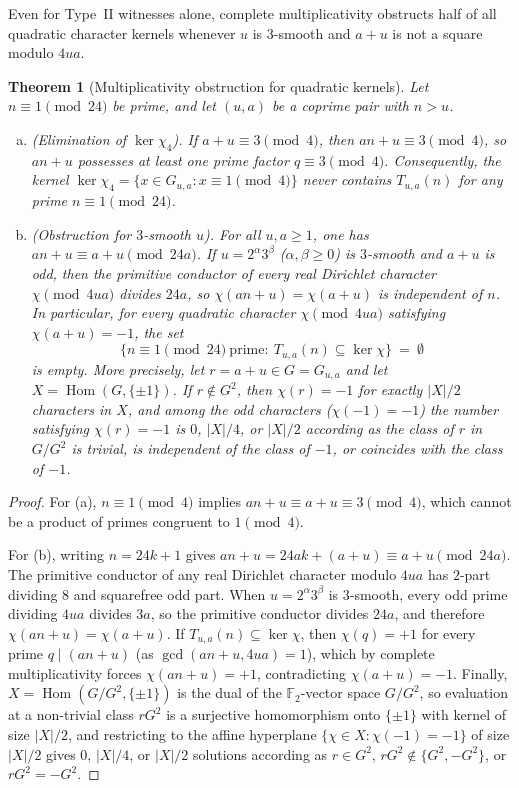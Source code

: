 \documentclass[11pt, a4paper]{article}
\theoremstyle{plain}
\newtheorem{theorem}{Theorem}[section]
\theoremstyle{definition}
\begin{document}
Even for Type~II witnesses alone, complete multiplicativity obstructs half of all quadratic character kernels whenever $u$ is $3$-smooth and $a+u$ is not a square modulo $4ua$.

\begin{theorem}[Multiplicativity obstruction for quadratic kernels]\label{thm:kernel_vacuity}
Let $n\equiv1\pmod{24}$ be prime, and let $(u,a)$ be a coprime pair with $n>u$.
\begin{enumerate}[(a)]
    \item \emph{(Elimination of $\ker\chi_4$).} If $a+u\equiv3\pmod 4$, then $an+u\equiv3\pmod 4$, so $an+u$ possesses at least one prime factor $q\equiv3\pmod 4$. Consequently, the kernel $\ker\chi_4=\{x\in G_{u,a}:x\equiv1\pmod 4\}$ never contains $T_{u,a}(n)$ for any prime $n\equiv1\pmod{24}$.
    \item \emph{(Obstruction for $3$-smooth $u$).} For all $u,a\ge1$, one has $an+u\equiv a+u\pmod{24a}$. If $u=2^{\alpha}3^{\beta}$ ($\alpha,\beta\ge0$) is $3$-smooth and $a+u$ is odd, then the primitive conductor of every real Dirichlet character $\chi\pmod{4ua}$ divides $24a$, so $\chi(an+u)=\chi(a+u)$ is independent of $n$. In particular, for every quadratic character $\chi\pmod{4ua}$ satisfying $\chi(a+u)=-1$, the set
    $$\big\{n\equiv1\pmod{24}\ \text{prime}:\ T_{u,a}(n)\subseteq\ker\chi\big\}\ =\ \emptyset$$
    is empty. More precisely, let $r=a+u\in G=G_{u,a}$ and let $X=\operatorname{Hom}(G,\{\pm1\})$. If $r\notin G^{2}$, then $\chi(r)=-1$ for exactly $|X|/2$ characters in $X$, and among the odd characters ($\chi(-1)=-1$) the number satisfying $\chi(r)=-1$ is $0$, $|X|/4$, or $|X|/2$ according as the class of $r$ in $G/G^{2}$ is trivial, is independent of the class of $-1$, or coincides with the class of $-1$.
\end{enumerate}
\end{theorem}
\begin{proof}
For (a), $n\equiv1\pmod 4$ implies $an+u\equiv a+u\equiv3\pmod 4$, which cannot be a product of primes congruent to $1\pmod 4$.

For (b), writing $n=24k+1$ gives $an+u=24ak+(a+u)\equiv a+u\pmod{24a}$. The primitive conductor of any real Dirichlet character modulo $4ua$ has $2$-part dividing $8$ and squarefree odd part. When $u=2^{\alpha}3^{\beta}$ is $3$-smooth, every odd prime dividing $4ua$ divides $3a$, so the primitive conductor divides $24a$, and therefore $\chi(an+u)=\chi(a+u)$. If $T_{u,a}(n)\subseteq\ker\chi$, then $\chi(q)=+1$ for every prime $q\mid(an+u)$ (as $\gcd(an+u,4ua)=1$), which by complete multiplicativity forces $\chi(an+u)=+1$, contradicting $\chi(a+u)=-1$. Finally, $X=\operatorname{Hom}(G/G^{2},\{\pm1\})$ is the dual of the $\mathbb{F}_2$-vector space $G/G^{2}$, so evaluation at a non-trivial class $rG^{2}$ is a surjective homomorphism onto $\{\pm1\}$ with kernel of size $|X|/2$, and restricting to the affine hyperplane $\{\chi\in X:\chi(-1)=-1\}$ of size $|X|/2$ gives $0$, $|X|/4$, or $|X|/2$ solutions according as $r\in G^{2}$, $rG^{2}\notin\{G^{2},-G^{2}\}$, or $rG^{2}=-G^{2}$.
\end{proof}
\end{document}
